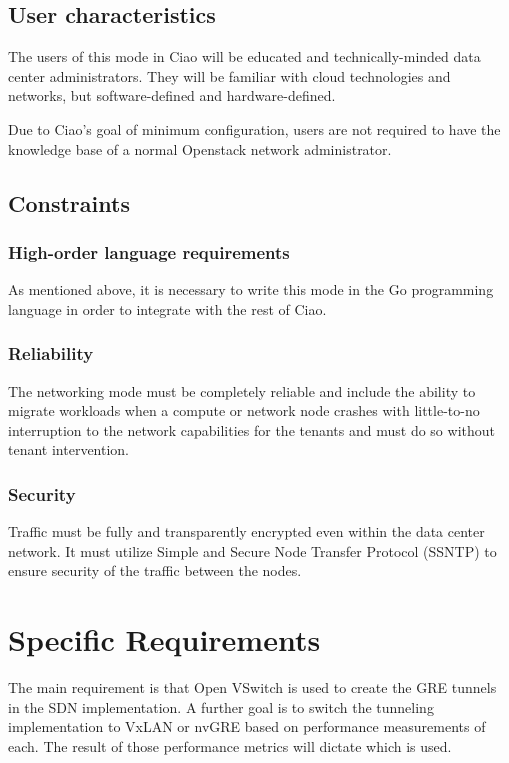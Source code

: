 \documentclass[10pt,letterpaper,onecolumn,draftclsnofoot]{IEEEtran}
\begin{document}
\subsection{User characteristics}

The users of this mode in Ciao will be educated and technically-minded data
center administrators. They will be familiar with cloud technologies and
networks, but software-defined and hardware-defined.

Due to Ciao's goal of minimum configuration, users are not required to
have the knowledge base of a normal Openstack network administrator.

\subsection{Constraints}

\subsubsection{High-order language requirements}

As mentioned above, it is necessary to write this mode in the Go programming
language in order to integrate with the rest of Ciao.

\subsubsection{Reliability}

The networking mode must be completely reliable and include the ability to
migrate workloads when a compute or network node crashes with little-to-no
interruption to the network capabilities for the tenants and must do so without
tenant intervention.

\subsubsection{Security}

Traffic must be fully and transparently encrypted even within the data center
network. It must utilize Simple and Secure Node Transfer Protocol (SSNTP) to
ensure security of the traffic between the nodes.

\section{Specific Requirements}

The main requirement is that Open VSwitch is used to create the GRE tunnels in
the SDN implementation. A further goal is to switch the tunneling implementation
to VxLAN or nvGRE based on performance measurements of each. The result of those
performance metrics will dictate which is used.
\end{document}
